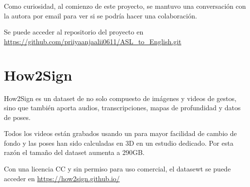 Como curiosidad, al comienzo de este proyecto, se mantuvo una conversación con la autora por email para ver si se podría hacer una colaboración.

Se puede acceder al repositorio del proyecto en \url{https://github.com/priiyaanjaalii0611/ASL_to_English.git}


\section{How2Sign}

How2Sign  es un dataset de  no solo compuesto de imágenes y videos de gestos, sino que también aporta audios, transcripciones, mapas de profundidad y datos de poses.

Todos los videos están grabados usando un  para mayor facilidad de cambio de fondo y las poses han sido calculadas en 3D en un estudio dedicado. Por esta razón el tamaño del dataset aumenta a 290GB.

Con una licencia CC y sin permiso para uso comercial, el datasewt se puede acceder en \url{https://how2sign.github.io/}